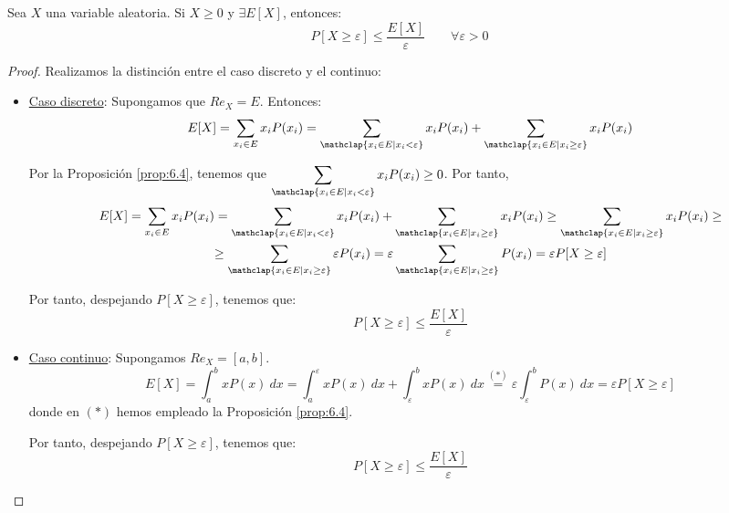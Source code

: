 \begin{teo}
    Sea $X$ una variable aleatoria. Si $X\geq 0$ y $\exists E[X]$, entonces:
    \begin{equation*}
        P[X\geq \varepsilon]\leq \dfrac{E[X]}{\varepsilon} \qquad \forall \varepsilon>0 
    \end{equation*}
\end{teo}
\begin{proof}
    Realizamos la distinción entre el caso discreto y el continuo:
    \begin{itemize}
        \item \underline{Caso discreto}: Supongamos que $Re_X=E$. Entonces:
        \begin{equation*}
            E[X]=\sum_{x_i\in E}x_iP(x_i)
            = \sum_{\mathclap{x_i\in E\mid x_i<\varepsilon}}x_iP(x_i) + \sum_{\mathclap{x_i\in E\mid x_i\geq \varepsilon}}x_iP(x_i)
        \end{equation*}

        Por la Proposición \ref{prop:6.4}, tenemos que $\displaystyle \sum\limits_{\mathclap{x_i\in E\mid x_i<\varepsilon}}x_iP(x_i)\geq 0$. Por tanto,
        \begin{multline*}
            E[X]
            =\sum_{x_i\in E}x_iP(x_i)
            = \sum_{\mathclap{x_i\in E\mid x_i<\varepsilon}}x_iP(x_i) + \sum_{\mathclap{x_i\in E\mid x_i\geq \varepsilon}}x_iP(x_i)
            \geq \sum_{\mathclap{x_i\in E\mid x_i\geq \varepsilon}}x_iP(x_i)
            \geq\\
            \geq \sum_{\mathclap{x_i\in E\mid x_i\geq \varepsilon}}\varepsilon P(x_i)
            = \varepsilon \sum_{\mathclap{x_i\in E\mid x_i\geq \varepsilon}} P(x_i)
            = \varepsilon P[X\geq \varepsilon]
        \end{multline*}

        Por tanto, despejando $P[X\geq \varepsilon]$, tenemos que:
        \begin{equation*}
            P[X\geq \varepsilon] \leq \frac{E[X]}{\varepsilon}
        \end{equation*}

        \item \underline{Caso continuo}: Supongamos $Re_X=[a,b]$. 
        \begin{equation*}
            E[X]
            =\int_a^b xP(x)~dx
            =\int_a^\varepsilon xP(x)~dx + \int_\varepsilon^b xP(x)~dx
            \stackrel{(\ast)}{=} \varepsilon \int_\varepsilon^b P(x)~dx
            = \varepsilon P[X\geq \varepsilon]
        \end{equation*}
        donde en $(\ast)$ hemos empleado la Proposición \ref{prop:6.4}.

        Por tanto, despejando $P[X\geq \varepsilon]$, tenemos que:
        \begin{equation*}
            P[X\geq \varepsilon] \leq \frac{E[X]}{\varepsilon}
        \end{equation*}
    \end{itemize}
\end{proof}

